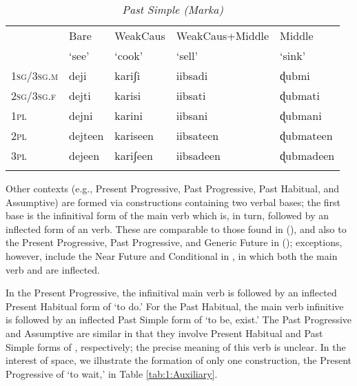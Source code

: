 \documentclass[output=paper]{../langsci/langscibook}
\begin{document}
 \begin{table}
 	\caption{\textit{Past Simple (Marka)}}
 	\label{tab:1:Past Simple}
 	\begin{tabularx}{\textwidth}{Xllll} 
 		\lsptoprule
 		& Bare   & WeakCaus  & WeakCaus+Middle & Middle   \\
 		& `see' & `cook' & `sell' & `sink' \\ 
 		\midrule
 		1\textsc{sg}/3\textsc{sg.m} & deji & kariʃi & iibsadi & ɖubmi \\
 		2\textsc{sg}/3\textsc{sg.f} & dejti  & karisi & iibsati  & ɖubmati  \\
 		1\textsc{pl} & dejni & karini & iibsani & ɖubmani \\
 		2\textsc{pl} & dejteen & kariseen & iibsateen & ɖubmateen \\
 		3\textsc{pl} & dejeen & kariʃeen & iibsadeen & ɖubmadeen \\
 		\lspbottomrule
 	\end{tabularx}
 \end{table}
 
 Other contexts (e.g., Present Progressive, Past Progressive, Past Habitual, and Assumptive) are formed via  constructions containing two verbal bases; the first base is the infinitival form of the main verb which is, in turn, followed by an inflected form of an  verb. These are comparable to those found in  (\citealt{Greenetal2015}), and also to the Present Progressive, Past Progressive, and Generic Future in  (\citealt{PasterRanero2015}); exceptions, however, include the Near Future and Conditional in , in which both the main verb and  are inflected.
 
 In the  Present Progressive, the infinitival main verb is followed by an inflected Present Habitual form of  `to do.' For the Past Habitual, the main verb infinitive is followed by an inflected Past Simple form of  `to be, exist.' The Past Progressive and Assumptive are similar in that they involve Present Habitual and Past Simple forms of , respectively; the precise meaning of this verb is unclear. In the interest of space, we illustrate the formation of only one  construction, the Present Progressive of  `to wait,' in Table \ref{tab:1:Auxiliary}. 
 
\end{document}
